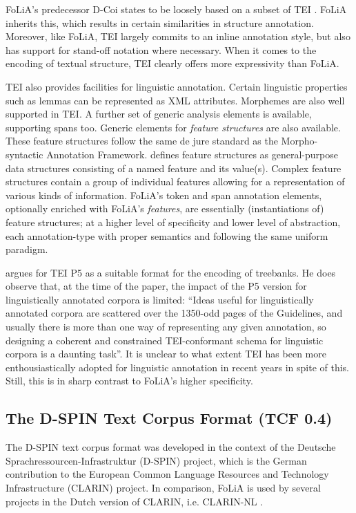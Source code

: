 \documentclass[a4paper,10pt,twoside]{article}
\begin{document}
FoLiA's predecessor D-Coi states to be loosely based on a subset of TEI
\cite{DCOI}. FoLiA inherits this, which results in certain similarities in
structure annotation. Moreover, like FoLiA, TEI largely commits to an inline
annotation style, but also has support for stand-off notation where necessary.
When it comes to the encoding of textual structure, TEI clearly offers more
expressivity than FoLiA. 

TEI also provides facilities for linguistic annotation. Certain linguistic
properties such as lemmas can be represented as XML attributes.  Morphemes are
also well supported in TEI. A further set of generic analysis elements is
available, supporting spans too. Generic elements for \emph{feature structures}
are also available. These feature structures follow the same de jure standard
as the Morpho-syntactic Annotation Framework.  defines
feature structures as general-purpose data structures consisting of a named
feature and its value(s). Complex feature structures contain a group of
individual features allowing for a representation of various kinds of
information. FoLiA's token and span annotation elements, optionally enriched
with FoLiA's \emph{features}, are essentially (instantiations of) feature
structures; at a higher level of specificity and lower level of abstraction,
each annotation-type with proper semantics and following the same uniform
paradigm.

 argues for TEI P5 as a suitable format for the encoding of
treebanks. He does observe that, at the time of the paper, the impact of the P5
version for linguistically annotated corpora is limited: ``Ideas useful for
linguistically annotated corpora are scattered over the 1350-odd pages of the
Guidelines, and usually there is more than one way of representing any given
annotation, so designing a coherent and constrained TEI-conformant schema for
linguistic corpora is a daunting task''.  It is unclear to what extent TEI has
been more enthousiastically adopted for linguistic annotation in recent years
in spite of this. Still, this is in sharp contrast to FoLiA's higher specificity.


\subsection{The D-SPIN Text Corpus Format (TCF 0.4)}

The D-SPIN text corpus format \cite{TCF} was developed in the context of the
Deutsche Sprachressourcen-Infrastruktur (D-SPIN) project, which is the
German contribution to the European Common Language Resources and Technology
Infrastructure (CLARIN) project. In comparison, FoLiA is used by several
projects in the Dutch version of CLARIN, i.e. CLARIN-NL  \cite{CLARINNL}.
\end{document}
